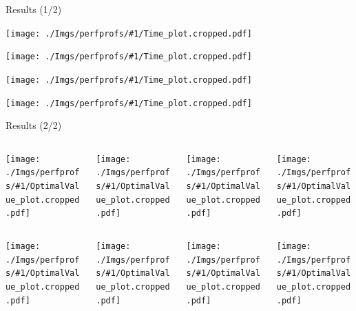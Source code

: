 \newcommand{\IncludeTimeProfile}[1]{
	\centering
	\texttt{[image: ./Imgs/perfprofs/\#1/Time\_plot.cropped.pdf]}
}

\newcommand{\IncludeDualBounds}[1]{
	\centering
	\texttt{[image: ./Imgs/perfprofs/\#1/OptimalValue\_plot.cropped.pdf]}
}

\begin{frame}{Results (1/2)}
	\IncludeTimeProfile{E-scaled-1.0}
\end{frame}
\begin{frame}
	\IncludeTimeProfile{E-scaled-4.0}
\end{frame}
\begin{frame}
	\IncludeTimeProfile{E-scaled-8.0}
\end{frame}
\begin{frame}
	\IncludeTimeProfile{E-scaled-20.0}
\end{frame}

\begin{frame}{Results (2/2)}
	\begin{columns}
		\begin{column}{0.25\textwidth}
			\IncludeDualBounds{E-scaled-1.0}
		\end{column}
		\begin{column}{0.25\textwidth}
			\IncludeDualBounds{E-scaled-4.0}
		\end{column}
		\begin{column}{0.25\textwidth}
			\IncludeDualBounds{E-scaled-8.0}
		\end{column}
		\begin{column}{0.25\textwidth}
			\IncludeDualBounds{E-scaled-20.0}
		\end{column}
	\end{columns}
	\begin{columns}
		\begin{column}{0.25\textwidth}
			\IncludeDualBounds{F-scaled-1.0}
		\end{column}
		\begin{column}{0.25\textwidth}
			\IncludeDualBounds{F-scaled-4.0}
		\end{column}
		\begin{column}{0.25\textwidth}
			\IncludeDualBounds{F-scaled-8.0}
		\end{column}
		\begin{column}{0.25\textwidth}
			\IncludeDualBounds{F-scaled-20.0}
		\end{column}
	\end{columns}

\end{frame}

